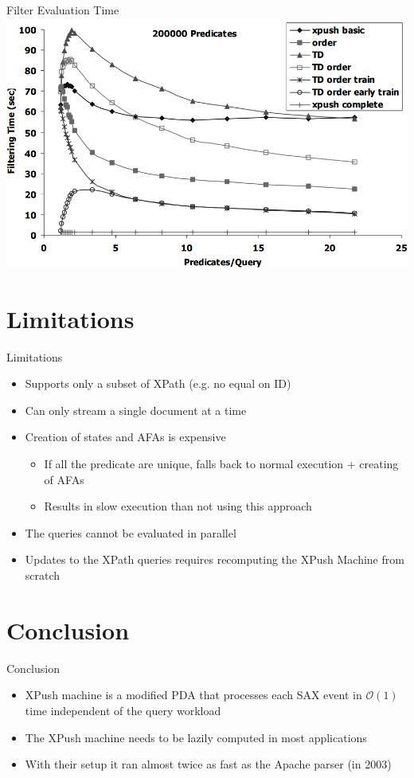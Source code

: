 \documentclass[mathserif,serif]{beamer}
\begin{document}
\begin{frame}{Filter Evaluation Time}
  \includegraphics[width=\textwidth]{filtertime}
\end{frame}

\section{Limitations}
\begin{frame}{Limitations}
  \begin{itemize}
    \item Supports only a subset of XPath (e.g. no equal on ID)
    \item Can only stream a single document at a time
    \item Creation of states and AFAs is expensive
    \begin{itemize}
      \item If all the predicate are unique, falls back to normal execution + creating of AFAs
      \item Results in slow execution than not using this approach
    \end{itemize}
    \item The queries cannot be evaluated in parallel
    \item Updates to the XPath queries requires recomputing the XPush Machine from scratch
  \end{itemize}
\end{frame}

\section{Conclusion}
\begin{frame}{Conclusion}
  \begin{itemize}
    \item XPush machine is a modified PDA that processes each SAX event in $\mathcal{O}(1)$ time independent of the query workload
    \item The XPush machine needs to be lazily computed in most applications
    \item With their setup it ran almost twice as fast as the Apache parser (in 2003)
  \end{itemize}
\end{frame}
\end{document}
